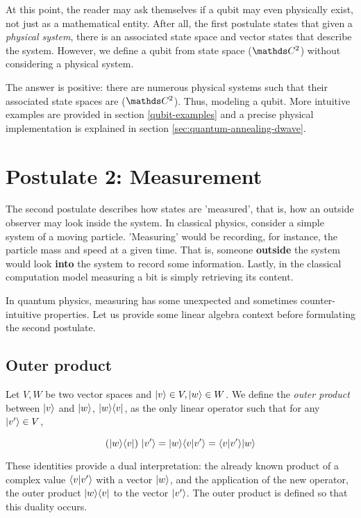 At this point, the reader may ask themselves if a qubit may even physically exist, not just as a mathematical entity. After all, the first postulate states that given a \emph{physical system}, there is an associated state space and vector states that describe the system. However, we define a qubit from state space ($\C^{2}$) without considering a physical system. 

The answer is positive: there are numerous physical systems such that their associated state spaces are ($\C^{2}$). Thus, modeling a qubit. More intuitive examples are provided in section \ref{qubit-examples} and a precise physical implementation is explained in section \ref{sec:quantum-annealing-dwave}.


\section{Postulate 2: Measurement}


The second postulate describes how states are 'measured', that is, how an outside observer may look inside the system. In classical physics, consider a simple system of a moving particle. 'Measuring' would be recording, for instance, the particle mass and speed at a given time. That is, someone \textbf{outside} the system would look \textbf{into} the system to record some information. Lastly, in the classical computation model measuring a bit is simply retrieving its content.

In quantum physics, measuring has some unexpected and sometimes counter-intuitive properties. Let us provide some linear algebra context before formulating the second postulate.


\subsection{Outer product}


\begin{definition}
	Let $V, W$ be two vector spaces and $|v\rangle \in V, |w\rangle \in W$. We define the \emph{outer product} between $|v\rangle$ and $|w\rangle$, $|w\rangle\langle v|$, as the only linear operator such that for any $|v'\rangle \in V$, 
	
	$$ (|w\rangle\langle v|) \ |v'\rangle = |w\rangle\langle v|v'\rangle = \langle v|v'\rangle |w\rangle$$
\end{definition}

These identities provide a dual interpretation: the already known product of a complex value $\langle v|v'\rangle$ with a vector $|w\rangle$, and the application of the new operator, the outer product $|w\rangle\langle v|$ to the vector $|v'\rangle$. The outer product is defined so that this duality occurs.

